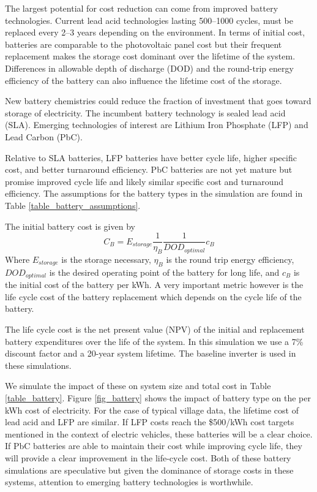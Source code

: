\documentclass[conference]{IEEEtran}
\begin{document}
The largest potential for cost reduction can come from improved
battery technologies.
Current lead acid technologies lasting 500--1000 cycles, must be
replaced every 2--3 years depending on the environment.
In terms of initial cost, batteries are comparable to the photovoltaic
panel cost but their frequent replacement makes the storage cost
dominant over the lifetime of the system.
Differences in allowable depth of discharge (DOD) and the round-trip
energy efficiency of the battery can also influence the lifetime
cost of the storage.

New battery chemistries could reduce the fraction of investment
that goes toward storage of electricity.
The incumbent battery technology is sealed lead acid (SLA).
Emerging technologies of interest are Lithium Iron Phosphate
(LFP) and Lead Carbon (PbC).

Relative to SLA batteries, LFP batteries
have better cycle life, higher specific cost, and better
turnaround efficiency.
PbC batteries are not yet mature but promise improved cycle
life and likely similar specific cost and turnaround
efficiency.
The assumptions for the battery types in the simulation
are found in Table \ref{table_battery_assumptions}.

The initial battery cost is given by
%
$$ C_B = E_{storage} \frac{1}{\eta_B} \frac{1}{DOD_{optimal}} c_B $$
%
Where $E_{storage}$ is the storage necessary, $\eta_B$ is the
round trip energy efficiency, $DOD_{optimal}$ is the desired
operating point of the battery for long life, and $c_B$ is the
initial cost of the battery per kWh.
A very important metric however is the life cycle cost of the
battery replacement which depends on the cycle life of the battery.

The life cycle cost is the net present value (NPV) of the
initial and replacement battery expenditures over the life
of the system.
In this simulation we use a 7\% discount factor and a 20-year
system lifetime.
The baseline inverter is used in these simulations.

We simulate the impact of these on system size and total cost
in Table \ref{table_battery}.
Figure \ref{fig_battery} shows the impact of battery type on
the per kWh cost of electricity.
For the case of typical village data, the lifetime cost of
lead acid and LFP are similar.
If LFP costs reach the \$500/kWh cost targets mentioned in
the context of electric vehicles, these batteries will
be a clear choice.
If PbC batteries are able to maintain their cost while
improving cycle life, they will provide a clear improvement
in the life-cycle cost.
Both of these battery simulations are speculative but given
the dominance of storage costs in these systems, attention
to emerging battery technologies is worthwhile.
\end{document}
